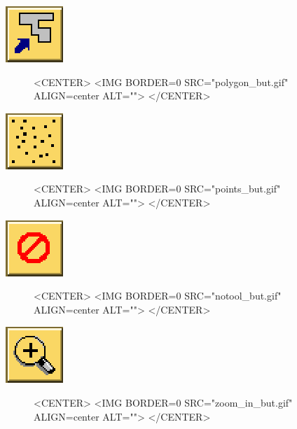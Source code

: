 \begin{ccTexOnly}
\mbox{\includegraphics{polygon_but.eps}}
\end{ccTexOnly}
\begin{figure}
\begin{ccHtmlOnly}
<CENTER>
<IMG BORDER=0 SRC="polygon_but.gif"  ALIGN=center  ALT="">
</CENTER>
\end{ccHtmlOnly}
\end{figure}

\begin{ccTexOnly}
\mbox{\includegraphics{points_but.eps}}
\end{ccTexOnly}
\begin{figure}
\begin{ccHtmlOnly}
<CENTER>
<IMG BORDER=0 SRC="points_but.gif"  ALIGN=center  ALT="">
</CENTER>
\end{ccHtmlOnly}
\end{figure}

\begin{ccTexOnly}
\mbox{\includegraphics{notool_but.eps}}
\end{ccTexOnly}
\begin{figure}
\begin{ccHtmlOnly}
<CENTER>
<IMG BORDER=0 SRC="notool_but.gif"  ALIGN=center  ALT="">
</CENTER>
\end{ccHtmlOnly}
\end{figure}

\begin{ccTexOnly}
\mbox{\includegraphics{zoom_in_but.eps}}
\end{ccTexOnly}
\begin{figure}
\begin{ccHtmlOnly}
<CENTER>
<IMG BORDER=0 SRC="zoom_in_but.gif"  ALIGN=center  ALT="">
</CENTER>
\end{ccHtmlOnly}
\end{figure}

